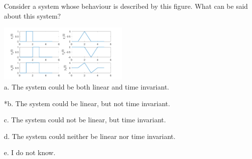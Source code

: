 
Consider a system whose behaviour is described by this figure.   What can be said about this system?

\includegraphics[width=2.5in]{../../Images/LTISystemsQ3.png}\\

a. The system could be both linear and time invariant.

*b. The system could be linear, but not time invariant.

c. The system could not be linear, but time invariant.

d. The system could neither be linear nor time invariant.

e. I do not know.\\
